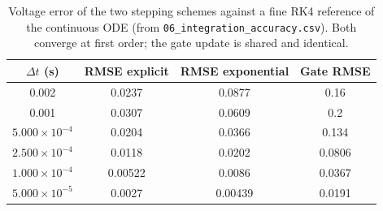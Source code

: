\begin{table}[t]
\centering
\caption{Voltage error of the two stepping schemes against a fine RK4 reference of the continuous ODE (from \texttt{06\_integration\_accuracy.csv}). Both converge at first order; the gate update is shared and identical.}
\label{tab:integration}
\begin{tabular}{cccc}
\toprule
$\Delta t$ (s) & RMSE explicit & RMSE exponential & Gate RMSE \\
\midrule
0.002 & 0.0237 & 0.0877 & 0.16 \\
0.001 & 0.0307 & 0.0609 & 0.2 \\
$5.000\!\times\!10^{-4}$ & 0.0204 & 0.0366 & 0.134 \\
$2.500\!\times\!10^{-4}$ & 0.0118 & 0.0202 & 0.0806 \\
$1.000\!\times\!10^{-4}$ & 0.00522 & 0.0086 & 0.0367 \\
$5.000\!\times\!10^{-5}$ & 0.0027 & 0.00439 & 0.0191 \\
\bottomrule
\end{tabular}
\end{table}
